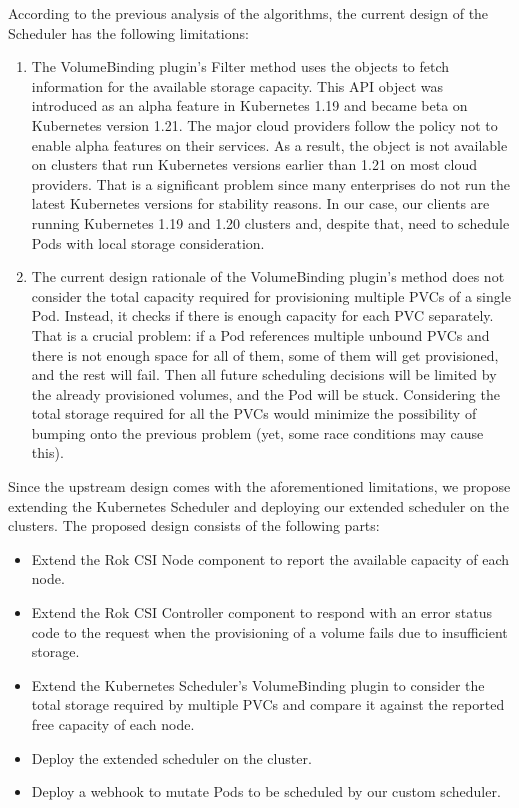 According to the previous analysis of the algorithms, the current design of the
Scheduler has the following limitations:
\begin{enumerate}
      \item The VolumeBinding plugin's Filter method uses the
             objects to fetch information for the
            available storage capacity. This API object was introduced as an
            alpha feature in Kubernetes 1.19 and became beta on Kubernetes
            version 1.21. The major cloud providers follow the policy not to
            enable alpha features on their services. As a result, the
             object is not available on clusters that run
            Kubernetes versions earlier than 1.21 on most cloud providers. That
            is a significant problem since many enterprises do not run the
            latest Kubernetes versions for stability reasons. In our case, our
            clients are running Kubernetes 1.19 and 1.20 clusters and, despite
            that, need to schedule Pods with local storage consideration.
      \item The current design rationale of the VolumeBinding plugin's method
            does not consider the total capacity required for provisioning
            multiple PVCs of a single Pod. Instead, it checks if there is enough
            capacity for each PVC separately. That is a crucial problem: if a
            Pod references multiple unbound PVCs and there is not enough space
            for all of them, some of them will get provisioned, and the rest
            will fail. Then all future scheduling decisions will be limited by
            the already provisioned volumes, and the Pod will be stuck.
            Considering the total storage required for all the PVCs would
            minimize the possibility of bumping onto the previous problem (yet,
            some race conditions may cause this).
\end{enumerate}

Since the upstream design comes with the aforementioned limitations, we propose
extending the Kubernetes Scheduler and deploying our extended scheduler on the
clusters. The proposed design consists of the following parts:
\begin{itemize}
      \tightlist
      \item Extend the Rok CSI Node component to report the available capacity
            of each node.
      \item Extend the Rok CSI Controller component to respond with an
             error status code to the 
            request when the provisioning of a volume fails due to insufficient
            storage.
      \item Extend the Kubernetes Scheduler's VolumeBinding plugin to consider
            the total storage required by multiple PVCs and compare it against
            the reported free capacity of each node.
      \item Deploy the extended scheduler on the cluster.
      \item Deploy a webhook to mutate Pods to be scheduled by our custom
            scheduler.
\end{itemize}

